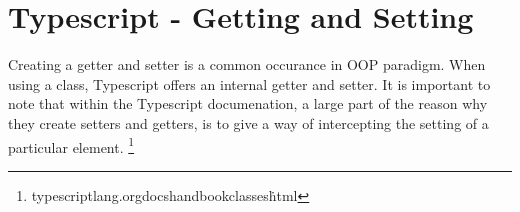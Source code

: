 \maketitle{}
\section{ Typescript - Getting and Setting  }
Creating a getter and setter is a common occurance in OOP paradigm. When using
a class, Typescript offers an internal getter and setter. It is important to
note that within the Typescript documenation, a large part of the reason why
they create setters and getters, is to give a way of intercepting the setting
of a particular element. \footnote{typescriptlang.org\/docs\/handbook\/classes\.html}

